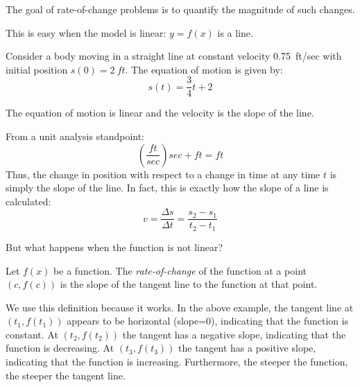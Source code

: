 \documentclass[letterpaper,12pt,fleqn]{article}
\begin{document}
The goal of rate-of-change problems is to quantify the magnitude of such changes.

This is easy when the model is linear: \(y=f(x)\) is a line.

\begin{example}
  Consider a body moving in a straight line at constant velocity \SI{0.75}{ft/sec} with initial position
  \(s(0)=\SI{2}{ft}\).  The equation of motion is given by:
  \[s(t)=\frac{3}{4}t+2\]
  \begin{center}
  \end{center}

  \bigskip

  The equation of motion is linear and the velocity is the slope of the line.

  From a unit analysis standpoint:
  \[\left(\frac{\si{ft}}{\si{sec}}\right)\si{sec}+\si{ft}=\si{ft}\]
  Thus, the change in position with respect to a change in time at any time \(t\) is simply the slope of the line.
  In fact, this is exactly how the slope of a line is calculated:
  \[v=\frac{\Delta s}{\Delta t}=\frac{s_2-s_1}{t_2-t_1}\]
\end{example}

But what happens when the function is not linear?

\begin{definition}
  Let \(f(x)\) be a function.  The \emph{rate-of-change} of the function at a point \((c,f(c))\) is the slope of
  the tangent line to the function at that point.
\end{definition}

We use this definition because it works.  In the above example, the tangent line at \((t_1,f(t_1))\) appears to be
horizontal (slope=0), indicating that the function is constant.  At \((t_2,f(t_2))\) the tangent has a negative
slope, indicating that the function is decreasing.  At \((t_3,f(t_3))\) the tangent has a positive slope, indicating
that the function is increasing.  Furthermore, the steeper the function, the steeper the tangent line.
\end{document}
